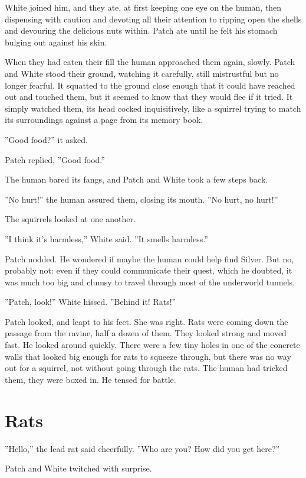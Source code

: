 \documentclass[12pt]{book}
\begin{document}
White joined him, and they ate, at first keeping one eye on the human, then dispensing with caution and devoting all their attention to ripping open the shells and devouring the delicious nuts within. Patch ate until he felt his stomach bulging out against his skin.

When they had eaten their fill the human approached them again, slowly. Patch and White stood their ground, watching it carefully, still mistrustful but no longer fearful. It squatted to the ground close enough that it could have reached out and touched them, but it seemed to know that they would flee if it tried. It simply watched them, its head cocked inquisitively, like a squirrel trying to match its surroundings against a page from its memory book.

''Good food?'' it asked.

Patch replied, ''Good food.''

The human bared its fangs, and Patch and White took a few steps back.

''No hurt!'' the human assured them, closing its mouth. ''No hurt, no hurt!''

The squirrels looked at one another.

''I think it's harmless,'' White said. ''It smells harmless.''

Patch nodded. He wondered if maybe the human could help find Silver. But no, probably not: even if they could communicate their quest, which he doubted, it was much too big and clumsy to travel through most of the underworld tunnels.

''Patch, look!'' White hissed. ''Behind it! Rats!''

Patch looked, and leapt to his feet. She was right. Rats were coming down the passage from the ravine, half a dozen of them. They looked strong and moved fast. He looked around quickly. There were a few tiny holes in one of the concrete walls that looked big enough for rats to squeeze through, but there was no way out for a squirrel, not without going through the rats. The human had tricked them, they were boxed in. He tensed for battle.


\section{Rats}

''Hello,'' the lead rat said cheerfully. ''Who are you? How did you get here?''

Patch and White twitched with surprise.
\end{document}
